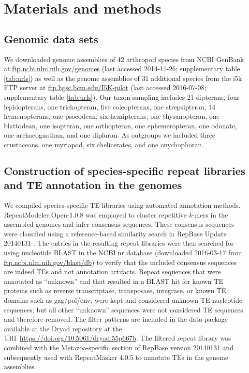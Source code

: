 \section{Materials and methods}

\subsection{Genomic data sets}

We downloaded genome assemblies of 42 arthropod species from NCBI
GenBank at \url{ftp.ncbi.nlm.nih.gov/genomes} (last accessed 2014-11-26;
supplementary table \ref{tab:urls}) as well as the genome assemblies of
31 additional species from the i5k FTP server at
\href{ftp://ftp.hgsc.bcm.edu:/I5K-pilot/}{ftp.hgsc.bcm.edu/I5K-pilot}
(last accessed 2016-07-08; supplementary table \ref{tab:urls}). Our
taxon sampling includes 21 dipterans, four lepidopterans, one
trichopteran, five coleopterans, one strepsipteran, 14 hymenopterans,
one psocodean, six hemipterans, one thysanopteran, one blattodean, one
isopteran, one orthopteran, one ephemeropteran, one odonate, one
archaeognathan, and one dipluran. As outgroups we included three
crustaceans, one myriapod, six chelicerates, and one onychophoran.

\subsection{Construction of species-specific repeat libraries and TE
annotation in the genomes}

We compiled species-specific TE libraries using automated annotation
methods. RepeatModeler Open-1.0.8 \citep{Smit2015} was employed to
cluster repetitive \emph{k}-mers in the assembled genomes and infer
consensus sequences. These consensus sequences were classified using a
reference-based similarity search in RepBase Update 20140131
\citep{Jurka2005}. The entries in the resulting repeat libraries were
then searched for using nucleotide BLAST in the NCBI nr database
(downloaded 2016-03-17 from
\href{ftp://ftp.ncbi.nlm.nih.gov/blast/db}{ftp.ncbi.nlm.nih.gov/blast/db})
to verify that the included consensus sequences are indeed TEs and not
annotation artifacts. Repeat sequences that were annotated as
``unknown'' and that resulted in a BLAST hit for known TE proteins such
as reverse transcriptase, transposase, integrase, or known TE domains
such as gag/pol/env, were kept and considered unknown TE nucleotide
sequences; but all other ``unknown'' sequences were not considered TE
sequences and therefore removed. The filter patterns are included in the
data package available at the Dryad repository at the
URI~\url{https://doi.org/10.5061/dryad.55p667b}. The filtered repeat
library was combined with the Metazoa-specific section of RepBase
version 20140131 and subsequently used with RepeatMasker 4.0.5
\citep{Smit2015} to annotate TEs in the genome assemblies.


